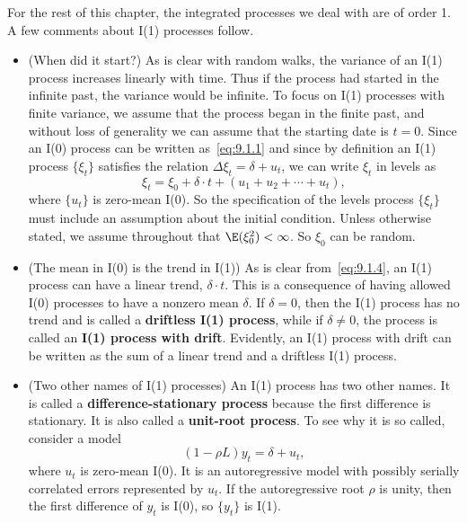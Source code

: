 For the rest of this chapter, the integrated processes we deal with are of order
1. A few comments about I(1) processes follow.

\begin{itemize}
\item (When did it start?) \enspace As is clear with random walks, the variance of an I(1) process increases linearly with time. Thus if the process had started in the infinite
past, the variance would be infinite. To focus on I(1) processes with finite variance, we assume that the process began in the finite past, and without loss of
generality we can assume that the starting date is $t = 0$. Since an I(0) process
can be written as~\eqref{eq:9.1.1} and since by definition an I(1) process $\{\xi_t\}$ satisfies the
relation $\Delta \xi_t = \delta + u_t$, we can write $\xi_t$ in levels as
\begin{equation}
\label{eq:9.1.4}
\xi_t = \xi_0 + \delta \cdot t + (u_1 + u_2 + \cdots + u_t),
\end{equation}
where $\{u_t\}$ is zero-mean I(0). So the specification of the levels process $\{\xi_t\}$ must
include an assumption about the initial condition. Unless otherwise stated, we
assume throughout that $\E(\xi_0^2) < \infty$. So $\xi_0$ can be random.

\item (The mean in I(0) is the trend in I(1)) \enspace As is clear from~\eqref{eq:9.1.4}, an I(1) process
can have a linear trend, $\delta \cdot t$. This is a consequence of having allowed I(0)
processes to have a nonzero mean $\delta$. If $\delta = 0$, then the I(1) process has no trend
and is called a \textbf{driftless I(1) process}, while if $\delta \neq 0$, the process is called an
\textbf{I(1) process with drift}. Evidently, an I(1) process with drift can be written as
the sum of a linear trend and a driftless I(1) process.

\item (Two other names of I(1) processes) \enspace An I(1) process has two other names. It is
called a \textbf{difference-stationary process} because the first difference is stationary.
It is also called a \textbf{unit-root process}. To see why it is so called, consider a model
\begin{equation}
\label{eq:9.1.5}
(1 - \rho L) y_t = \delta + u_t,
\end{equation}
where $u_t$ is zero-mean I(0). It is an autoregressive model with possibly serially
correlated errors represented by $u_t$. If the autoregressive root $\rho$ is unity, then the
first difference of $y_t$ is I(0), so $\{y_t\}$ is I(1).
\end{itemize}


